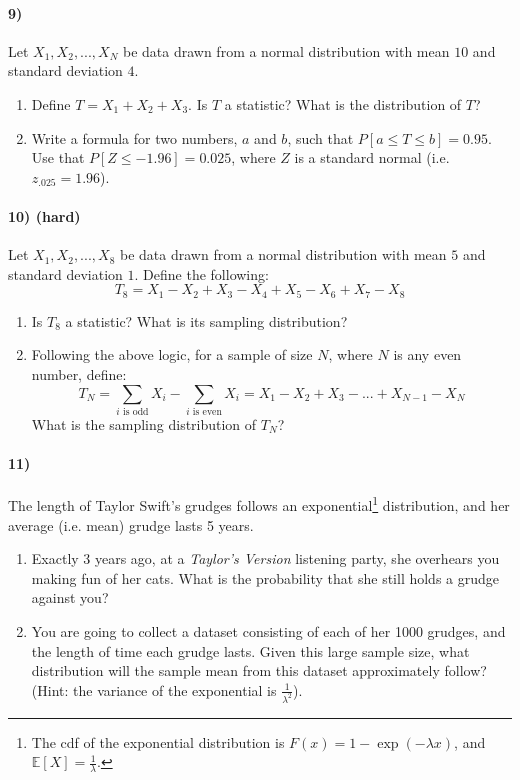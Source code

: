 \documentclass[12pt]{article}
\newcommand\EE{\mathbb{E}}
\numberwithin{equation}{section}
\numberwithin{figure}{section}
\numberwithin{table}{section}
\begin{document}
\paragraph{9)} Let $X_1,X_2,...,X_N$ be data drawn from a normal distribution with mean $10$ and standard deviation $4$.
\begin{enumerate}
\item Define $T = X_1+X_2+X_3$. Is $T$ a statistic? What is the distribution of $T$?
\item Write a formula for two numbers, $a$ and $b$, such that  $P[a\leq T \leq b] = 0.95$. Use that $P[Z\leq-1.96]=0.025$, where $Z$ is a standard normal (i.e. $z_{.025}=1.96$).
\end{enumerate}

\paragraph{10) (hard)} Let $X_1,X_2,...,X_8$ be data drawn from a normal distribution with mean $5$ and standard deviation $1$. Define the following:
\[T_8 = X_1-X_2+X_3-X_4+X_5-X_6+X_7-X_8 \]
\begin{enumerate}
\item Is $T_8$ a statistic? What is its sampling distribution?
\item Following the above logic, for a sample of size $N$, where $N$ is any even number, define:
\[T_N = \sum_{i \text{ is odd}}X_i - \sum_{i\text{ is even}}X_i = X_1-X_2+X_3-...+X_{N-1}-X_{N} \]
What is the sampling distribution of $T_N$?
\end{enumerate}

\paragraph{11)} The length of Taylor Swift's grudges follows an exponential\footnote{The cdf of the exponential distribution is $F(x)=1-\exp(-\lambda x)$, and $\EE[X]=\frac{1}{\lambda}$.} distribution, and her average (i.e. mean) grudge lasts 5 years.
\begin{enumerate}
\item Exactly 3 years ago, at a \emph{Taylor's Version} listening party, she overhears you making fun of her cats. What is the probability that she still holds a grudge against you?
\item You are going to collect a dataset consisting of each of her 1000 grudges, and the length of time each grudge lasts. Given this large sample size, what distribution will the sample mean from this dataset approximately follow? (Hint: the variance of the exponential is $\frac{1}{\lambda^2}$).
\end{enumerate}
\end{document}
